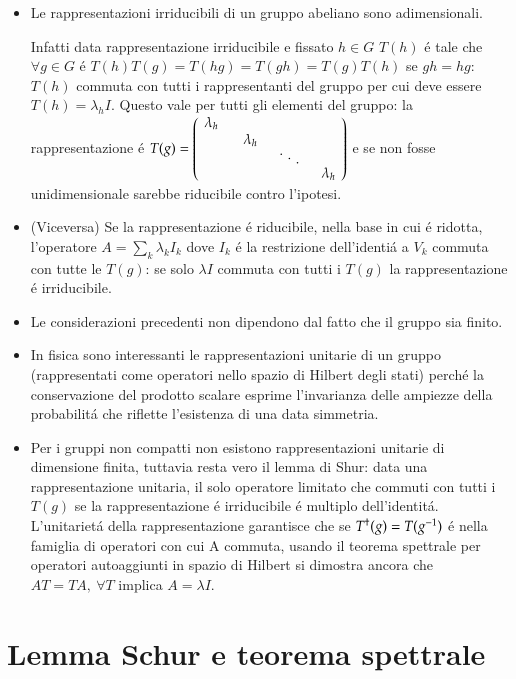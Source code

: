 \documentclass[oneside,12pt]{memoir}
\begin{document}
\begin{itemize}
    \item Le rappresentazioni irriducibili di un gruppo abeliano sono adimensionali.

    Infatti data rappresentazione irriducibile e fissato $h\in G$ $T(h)$ \'e tale che $\forall g\in G$ \'e $T(h)T(g)=T(hg)=T(gh)=T(g)T(h)$ se $gh=hg$: $T(h)$ commuta con tutti i rappresentanti del gruppo per cui deve essere $T(h)=\lambda_h I$. Questo vale per tutti gli elementi del gruppo: la rappresentazione \'e $T(g)=\begin{pmatrix}\diagentry{\lambda_h}\\&\diagentry{\lambda_h}\\&&\diagentry{\xddots}\\&&&\diagentry{\lambda_h}\end{pmatrix}$ e se non fosse unidimensionale sarebbe riducibile contro l'ipotesi.
    \item (Viceversa) Se la rappresentazione \'e riducibile, nella base in cui \'e ridotta, l'operatore $A=\sum_k\lambda_kI_k$ dove $I_k$ \'e la restrizione dell'identi\'a a $V_k$ commuta con tutte le $T(g)$: se solo $\lambda I$ commuta con tutti i $T(g)$ la rappresentazione \'e irriducibile.
    \item Le considerazioni precedenti non dipendono dal fatto che il gruppo sia finito.
    \item In fisica sono interessanti  le rappresentazioni unitarie di un gruppo (rappresentati come operatori nello spazio di Hilbert degli stati) perch\'e la conservazione del prodotto scalare esprime l'invarianza delle ampiezze della probabilit\'a che riflette l'esistenza di una data simmetria.
    \item Per i gruppi non compatti non esistono rappresentazioni unitarie di dimensione finita, tuttavia resta vero il lemma di Shur: data una rappresentazione unitaria, il solo operatore limitato che commuti con tutti i $T(g)$ se la rappresentazione \'e irriducibile \'e multiplo dell'identit\'a.
     L'unitariet\'a della rappresentazione garantisce che se ${{T}^{\dag}}(g)=T({{g}^{-1}})$ \'e nella famiglia di operatori con cui A commuta, usando il teorema spettrale per operatori autoaggiunti in spazio di Hilbert si dimostra ancora che $AT=TA,\ \forall T$ implica $A=\lambda I$.
\end{itemize}


\section{Lemma Schur e teorema spettrale}
\end{document}
